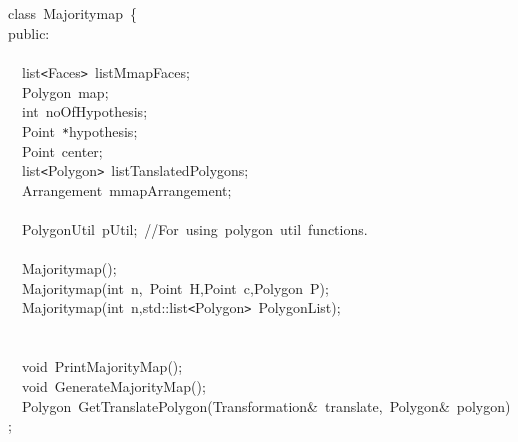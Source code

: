 {
\noindent \ttfamily
\jttstylea \\
\jttstylea \\
\jttstylea \\
\jttstylea \\
\jttstylee class~\jttstylek Majoritymap~\jttstylei \{\\
\jttstylee public\jttstylek :\\
\jttstylea \\
\jttstylea ~~\jttstylek list\verb#<#Faces\verb#>#~listMmapFaces;\\
\jttstylea ~~\jttstylek Polygon~map;\\
\jttstylea ~~\jttstylej int~\jttstylek noOfHypothesis;\\
\jttstylea ~~\jttstylek Point~\verb#*#hypothesis;\\
\jttstylea ~~\jttstylek Point~center;\\
\jttstylea ~~\jttstylek list\verb#<#Polygon\verb#>#~listTanslatedPolygons;\\
\jttstylea ~~\jttstylek Arrangement~mmapArrangement;\\
\jttstylea \\
\jttstylea ~~\jttstylek PolygonUtil~pUtil;~\jttstyled //For~using~polygon~util~functions.\\
\jttstylea \\
\jttstylea ~~\jttstylek Majoritymap\jttstylei ()\jttstylek ;\\
\jttstylea ~~\jttstylek Majoritymap\jttstylei (\jttstylej int~\jttstylek n,~Point~H\jttstylei []\jttstylek ,Point~c,Polygon~P\jttstylei )\jttstylek ;\\
\jttstylea ~~\jttstylek Majoritymap\jttstylei (\jttstylej int~\jttstylek n,std::list\verb#<#Polygon\verb#>#~PolygonList\jttstylei )\jttstylek ;\\
\jttstylea \\
\jttstylea \\
\jttstylea ~~\jttstylej void~\jttstylek PrintMajorityMap\jttstylei ()\jttstylek ;\\
\jttstylea ~~\jttstylej void~\jttstylek GenerateMajorityMap\jttstylei ()\jttstylek ;\\
\jttstylea ~~\jttstylek Polygon~GetTranslatePolygon\jttstylei (\jttstylek Transformation\&~translate,~Polygon\&~polygon\jttstylei )\jttstylek ;\\
}
